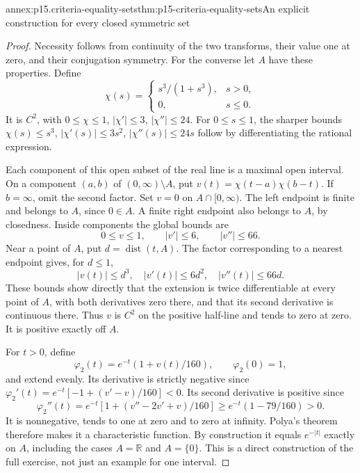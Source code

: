 \begin{annexitem}{annex:p15.criteria-equality-sets}{thm:p15-criteria-equality-sets}{An explicit construction for every closed symmetric set}
\begin{proof}
Necessity follows from continuity of the two transforms,
their value one at zero, and their conjugation symmetry.
For the converse let \(A\) have these properties.
Define
\[
 \chi(s)=\begin{cases}s^3/(1+s^3),&s>0,\\0,&s\leq0.\end{cases}
\]
It is \(C^2\), with \(0\leq\chi\leq1\),
\(|\chi'|\leq3\), \(|\chi''|\leq24\).
For \(0\leq s\leq1\), the sharper bounds
\(\chi(s)\leq s^3\), \(|\chi'(s)|\leq3s^2\),
\(|\chi''(s)|\leq24s\) follow by differentiating
the rational expression.

Each component of this open subset of the real line is
a maximal open interval. On a component \((a,b)\) of
\((0,\infty)\setminus A\),
put \(v(t)=\chi(t-a)\chi(b-t)\).
If \(b=\infty\), omit the second factor.
Set \(v=0\) on \(A\cap[0,\infty)\).
The left endpoint is finite and belongs to \(A\),
since \(0\in A\). A finite right endpoint also belongs
to \(A\), by closedness.
Inside components the global bounds are
\[
 0\leq v\leq1,\qquad |v'|\leq6,\qquad |v''|\leq66.
\]
Near a point of \(A\), put \(d=\operatorname{dist}(t,A)\).
The factor corresponding to a nearest endpoint gives,
for \(d\leq1\),
\[
 |v(t)|\leq d^3,\quad |v'(t)|\leq6d^2,\quad
                         |v''(t)|\leq66d.
\]
These bounds show directly that the extension is
twice differentiable at every point of \(A\), with
both derivatives zero there, and that its second
derivative is continuous there.
Thus \(v\) is \(C^2\) on the positive half-line and
tends to zero at zero. It is positive exactly off \(A\).

For \(t>0\), define
\[
 \varphi_2(t)=e^{-t}(1+v(t)/160),
 \qquad \varphi_2(0)=1,
\]
and extend evenly.
Its derivative is strictly negative since
\(\varphi_2'(t)=e^{-t}[-1+(v'-v)/160]<0\).
Its second derivative is positive since
\[
 \varphi_2''(t)=e^{-t}[1+(v''-2v'+v)/160]
                     \geq e^{-t}(1-79/160)>0.
\]
It is nonnegative, tends to one at zero and to zero
at infinity. Polya's theorem therefore makes it a
characteristic function.
By construction it equals \(e^{-|t|}\) exactly on \(A\),
including the cases \(A=\mathbb R\) and \(A=\{0\}\).
This is a direct construction of the full exercise,
not just an example for one interval.
\end{proof}
\end{annexitem}

